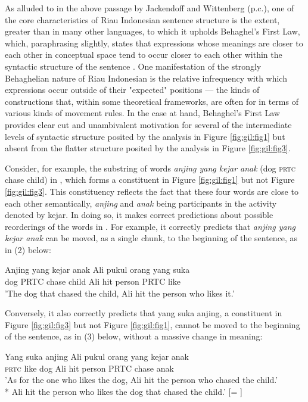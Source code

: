\documentclass[output=paper,colorlinks,citecolor=brown
]{langscibook}
\begin{document}
As alluded to in the above passage by Jackendoff and Wittenberg (p.c.), one of the core characteristics of Riau Indonesian sentence structure is the extent, greater than in many other languages, to which it upholds Behaghel's First Law, which, paraphrasing slightly, states that expressions whose meanings are closer to each other in conceptual space tend to occur closer to each other within the syntactic structure of the sentence \citep{behaghel1932deutsche}.  One manifestation of the strongly Behaghelian nature of Riau Indonesian is the relative infrequency with which expressions occur outside of their "expected" positions — the kinds of constructions that, within some theoretical frameworks, are often for in terms of various kinds of movement rules.  In the case at hand, Behaghel's First Law provides clear cut and unambivalent motivation for several of the intermediate levels of syntactic structure posited by the analysis in Figure \ref{fig:gil:fig1} but absent from the flatter structure posited by the analysis in Figure \ref{fig:gil:fig3}.

Consider, for example, the substring of words \emph{anjing yang kejar anak} (dog \textsc{prtc} chase child) in , which forms a constituent in Figure \ref{fig:gil:fig1} but not Figure \ref{fig:gil:fig3}.  This constituency reflects the fact that these four words are close to each other semantically, \emph{anjing} and \emph{anak} being participants in the activity denoted by kejar.  In doing so, it makes correct predictions about possible reorderings of the words in .  For example, it correctly predicts that \emph{anjing yang kejar anak} can be moved, as a single chunk, to the beginning of the sentence, as in (2) below:

\ea
\gll Anjing	yang	kejar	anak	Ali	pukul	orang	yang	suka\\
 dog	PRTC	chase	child	Ali	hit	person	PRTC	like	\\
\glt 'The dog that chased the child, Ali hit the person who likes it.'
\z

Conversely, it also correctly predicts that yang suka anjing, a constituent in Figure \ref{fig:gil:fig3} but not Figure \ref{fig:gil:fig1}, cannot be moved to the beginning of the sentence, as in (3) below, without a massive change in meaning:

\ea
\gll Yang	suka	anjing	Ali	pukul	orang	yang	kejar	anak\\
 \textsc{prtc}	like	dog	Ali	hit	person	PRTC	chase	anak\\
\glt 'As for the one who likes the dog, Ali hit the person who chased the child.' \\
*	Ali hit the person who likes the dog that chased the child.' [= ]
\z
\end{document}
